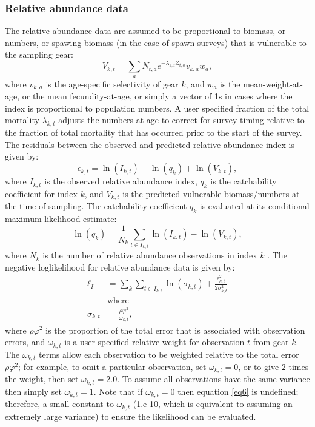 \subsubsection{Relative abundance data}
The relative abundance data are assumed to be proportional to biomass, or numbers, or spawing biomass (in the case of spawn surveys) that is vulnerable to the sampling gear:
\begin{equation}\label{eq4}
 V_{k,t} = \sum_a N_{t,a} e^{-\lambda_{k,t} Z_{t,a}} v_{k,a} w_a,
\end{equation}
where $v_{k,a}$ is the age-specific selectivity of gear $k$, and $w_a$ is the mean-weight-at-age, or the mean fecundity-at-age, or simply a vector of 1s in cases where the index is proportional to population numbers. A user specified fraction of the total mortality $\lambda_{k,t}$ adjusts the numbers-at-age to correct for survey timing relative to the fraction of total mortality that has occurred prior to the start of the survey.  The residuals between the observed and predicted relative abundance index is given by:
\begin{equation}\label{eq5}
\epsilon_{k,t} = \ln(I_{k,t}) - \ln(q_k)+\ln(V_{k,t}),
\end{equation}
where $I_{k,t}$ is the observed relative abundance index, $q_k$ is the catchability coefficient for index $k$, and $V_{k,t}$ is the predicted vulnerable biomass/numbers at the time of sampling.  The catchability coefficient $q_k$ is evaluated at its conditional maximum likelihood estimate:
\[
  \ln(q_k) =\frac{1}{N_k} \sum_{t \in I_{k,t}} \ln(I_{k,t}) - \ln(V_{k,t}),
\]
where $N_k$ is the number of relative abundance observations in index $k$ \citep[see][for more information]{walters1994calculation}. The negative loglikelihood for relative abundance data is given by:
\begin{align}
\ell_I &= \sum_k \sum_{t \in I_{k,t}}  \ln(\sigma_{k,t})+\frac{\epsilon_{k,t}^2}{2\sigma_{k,t}^2} \label{eq6}\\
&\mbox{where}\nonumber\\
\sigma_{k,t} &= \frac{\rho \varphi^2}{ \omega_{k,t}},  \nonumber
\end{align}
where $\rho \varphi^2$ is the proportion of the total error that is associated with observation errors, and $\omega_{k,t}$ is a user specified relative weight for observation $t$ from gear $k$.  The $ \omega_{k,t}$ terms allow each observation to be weighted relative to the total error $\rho \varphi^2$; for example, to omit a particular observation, set $\omega_{k,t}=0$, or to give 2 times the weight, then set  $\omega_{k,t}=2.0$. To assume all observations have the same variance then simply set  $\omega_{k,t}=1$.  Note that if  $\omega_{k,t}=0$ then equation \eqref{eq6} is undefined; therefore,  a small constant to  $\omega_{k,t}$ (1.e-10, which is equivalent to assuming an extremely large variance)  to ensure the likelihood can be evaluated.  

